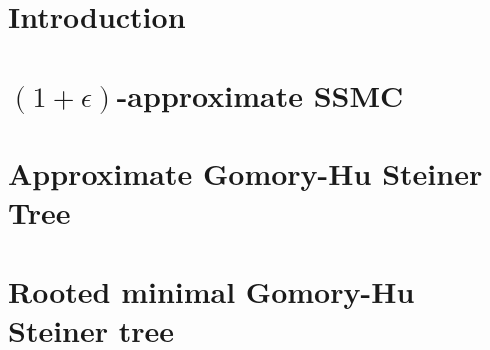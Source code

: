 \documentclass[11pt]{article}
\newcommand{\e}{\epsilon}
\newcommand{\1}{\mathbbm 1}
\begin{document}
\setcounter{page}{1}

\section{Introduction}
\label{sec:introduction}


%

\section{$(1+\e)$-approximate SSMC}


\section{Approximate Gomory-Hu Steiner Tree}



\appendix

\section{Rooted minimal Gomory-Hu Steiner tree}

\end{document}
